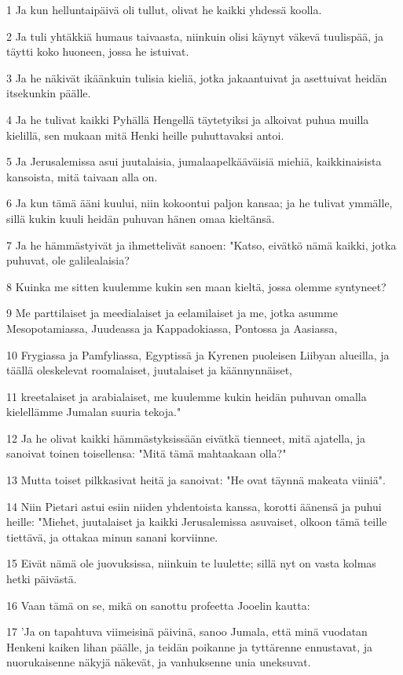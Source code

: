 \par 1 Ja kun helluntaipäivä oli tullut, olivat he kaikki yhdessä koolla.
\par 2 Ja tuli yhtäkkiä humaus taivaasta, niinkuin olisi käynyt väkevä tuulispää, ja täytti koko huoneen, jossa he istuivat.
\par 3 Ja he näkivät ikäänkuin tulisia kieliä, jotka jakaantuivat ja asettuivat heidän itsekunkin päälle.
\par 4 Ja he tulivat kaikki Pyhällä Hengellä täytetyiksi ja alkoivat puhua muilla kielillä, sen mukaan mitä Henki heille puhuttavaksi antoi.
\par 5 Ja Jerusalemissa asui juutalaisia, jumalaapelkääväisiä miehiä, kaikkinaisista kansoista, mitä taivaan alla on.
\par 6 Ja kun tämä ääni kuului, niin kokoontui paljon kansaa; ja he tulivat ymmälle, sillä kukin kuuli heidän puhuvan hänen omaa kieltänsä.
\par 7 Ja he hämmästyivät ja ihmettelivät sanoen: "Katso, eivätkö nämä kaikki, jotka puhuvat, ole galilealaisia?
\par 8 Kuinka me sitten kuulemme kukin sen maan kieltä, jossa olemme syntyneet?
\par 9 Me parttilaiset ja meedialaiset ja eelamilaiset ja me, jotka asumme Mesopotamiassa, Juudeassa ja Kappadokiassa, Pontossa ja Aasiassa,
\par 10 Frygiassa ja Pamfyliassa, Egyptissä ja Kyrenen puoleisen Liibyan alueilla, ja täällä oleskelevat roomalaiset, juutalaiset ja käännynnäiset,
\par 11 kreetalaiset ja arabialaiset, me kuulemme kukin heidän puhuvan omalla kielellämme Jumalan suuria tekoja."
\par 12 Ja he olivat kaikki hämmästyksissään eivätkä tienneet, mitä ajatella, ja sanoivat toinen toisellensa: "Mitä tämä mahtaakaan olla?"
\par 13 Mutta toiset pilkkasivat heitä ja sanoivat: "He ovat täynnä makeata viiniä".
\par 14 Niin Pietari astui esiin niiden yhdentoista kanssa, korotti äänensä ja puhui heille: "Miehet, juutalaiset ja kaikki Jerusalemissa asuvaiset, olkoon tämä teille tiettävä, ja ottakaa minun sanani korviinne.
\par 15 Eivät nämä ole juovuksissa, niinkuin te luulette; sillä nyt on vasta kolmas hetki päivästä.
\par 16 Vaan tämä on se, mikä on sanottu profeetta Jooelin kautta:
\par 17 'Ja on tapahtuva viimeisinä päivinä, sanoo Jumala, että minä vuodatan Henkeni kaiken lihan päälle, ja teidän poikanne ja tyttärenne ennustavat, ja nuorukaisenne näkyjä näkevät, ja vanhuksenne unia uneksuvat.
